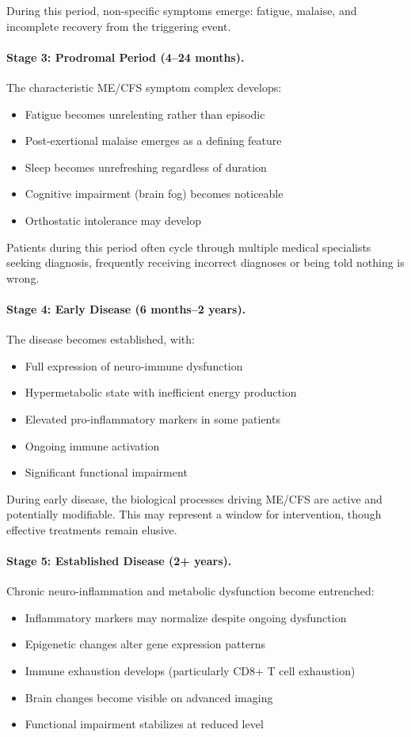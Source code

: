 During this period, non-specific symptoms emerge: fatigue, malaise, and incomplete recovery from the triggering event.

\paragraph{Stage 3: Prodromal Period (4--24 months).}
The characteristic ME/CFS symptom complex develops:
\begin{itemize}
    \item Fatigue becomes unrelenting rather than episodic
    \item Post-exertional malaise emerges as a defining feature
    \item Sleep becomes unrefreshing regardless of duration
    \item Cognitive impairment (brain fog) becomes noticeable
    \item Orthostatic intolerance may develop
\end{itemize}

Patients during this period often cycle through multiple medical specialists seeking diagnosis, frequently receiving incorrect diagnoses or being told nothing is wrong.

\paragraph{Stage 4: Early Disease (6 months--2 years).}
The disease becomes established, with:
\begin{itemize}
    \item Full expression of neuro-immune dysfunction
    \item Hypermetabolic state with inefficient energy production
    \item Elevated pro-inflammatory markers in some patients
    \item Ongoing immune activation
    \item Significant functional impairment
\end{itemize}

During early disease, the biological processes driving ME/CFS are active and potentially modifiable. This may represent a window for intervention, though effective treatments remain elusive.

\paragraph{Stage 5: Established Disease (2+ years).}
Chronic neuro-inflammation and metabolic dysfunction become entrenched:
\begin{itemize}
    \item Inflammatory markers may normalize despite ongoing dysfunction
    \item Epigenetic changes alter gene expression patterns
    \item Immune exhaustion develops (particularly CD8+ T cell exhaustion)
    \item Brain changes become visible on advanced imaging
    \item Functional impairment stabilizes at reduced level
\end{itemize}

